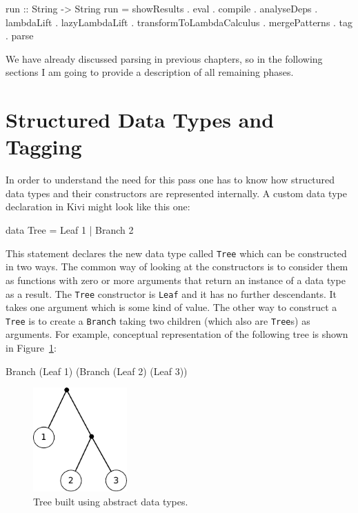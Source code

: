 \documentclass[12pt,a4paper]{report}
\begin{document}
\vspace*{0.2in}
\begin{code}[style=haskell]
run :: String -> String
run = showResults
    . eval
    . compile
    . analyseDeps
    . lambdaLift
    . lazyLambdaLift
    . transformToLambdaCalculus
    . mergePatterns
    . tag
    . parse
\end{code}

We have already discussed parsing in previous chapters, so in the following
sections I am going to provide a description of all remaining phases.

\section{Structured Data Types and Tagging}
In order to understand the need for this pass one has to know how structured
data types and their constructors are represented internally.
A custom data type declaration in Kivi might look like this one:

\vspace*{0.2in}
\begin{code}[style=haskell]
data Tree = Leaf 1 | Branch 2
\end{code}

This statement declares the new data type called \texttt{Tree} which can be
constructed in two ways. The common way of looking at the constructors is to
consider them as functions with zero or more arguments that return an instance
of a data type as a result. The \texttt{Tree} constructor is \texttt{Leaf} and
it has no further descendants. It takes one argument which is some kind of
value. The other way to construct a \texttt{Tree} is to create a \texttt{Branch}
taking two children (which also are \texttt{Tree}s) as arguments. For example,
conceptual representation of the following tree is shown in Figure~\ref{fig:tree}:

\vspace*{0.2in}
\begin{code}[style=haskell]
Branch (Leaf 1) (Branch (Leaf 2) (Leaf 3))
\end{code}

\begin{figure}[h!]
  \centering
  \includegraphics[height=4cm]{tree}
  \caption{Tree built using abstract data types.}
  \label{fig:tree}
\end{figure}
\end{document}
